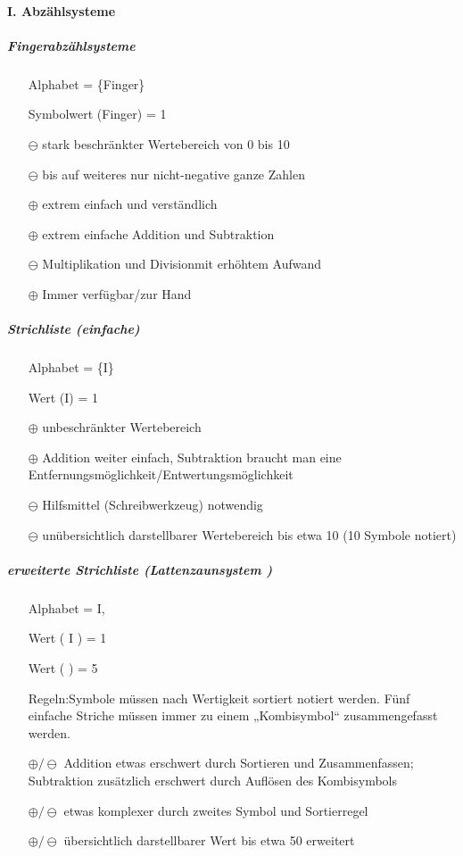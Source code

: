 \documentclass[10pt,a4paper]{scrartcl}
\begin{document}
	\paragraph{I. Abzählsysteme}
	\subparagraph{Fingerabzählsysteme}
	\begin{itemize}
		\item[] Alphabet = \{Finger\}
		\item[] Symbolwert (Finger) = 1
		\item[$ \ominus $] stark beschränkter Wertebereich von 0 bis 10
		\item[$ \ominus $] bis auf weiteres nur nicht-negative ganze Zahlen
		\item[$ \oplus $] extrem einfach und verständlich		
		\item[$ \oplus $] extrem einfache Addition und Subtraktion
		\item[$ \ominus $] Multiplikation und Divisionmit erhöhtem Aufwand
		\item[$ \oplus $] Immer verfügbar/\glqq zur Hand\grqq\
	\end{itemize}
	\subparagraph{Strichliste (einfache)}
	\begin{itemize}
		\item[] Alphabet = \{I\}
		\item[] Wert (I) = 1
		\item[$ \oplus $] unbeschränkter Wertebereich
		\item[$ \oplus $] Addition weiter einfach, Subtraktion braucht man eine Entfernungsmöglichkeit/Entwertungsmöglichkeit
		\item[$ \ominus $] Hilfsmittel (Schreibwerkzeug) notwendig
		\item[$ \ominus $] unübersichtlich darstellbarer Wertebereich bis etwa 10 (10 Symbole notiert)
	\end{itemize}
	\subparagraph{erweiterte Strichliste (\glqq Lattenzaunsystem \grqq)}
	\begin{itemize}
		\item[] Alphabet = {I, }
		\item[] Wert ( I ) = 1
		\item[] Wert (  ) = 5
		\item[] Regeln:Symbole müssen nach Wertigkeit sortiert notiert werden. Fünf einfache Striche müssen immer zu einem „Kombisymbol“ zusammengefasst werden.
		\item[$ \oplus/\ominus $] Addition etwas erschwert durch Sortieren und Zusammenfassen; Subtraktion zusätzlich erschwert durch Auflösen des Kombisymbols 
		\item[$ \oplus/\ominus $] etwas komplexer durch zweites Symbol und Sortierregel
		\item[$ \oplus/\ominus $] übersichtlich darstellbarer Wert bis etwa 50 erweitert
	\end{itemize}
\end{document}
